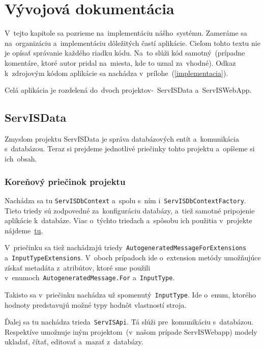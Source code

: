 \chapter{Vývojová dokumentácia}

V~tejto kapitole sa pozrieme na~implementáciu nášho~systému. Zameráme sa na~organizáciu a~implementáciu dôležitých častí aplikácie. Cieľom tohto textu nie je opísať správanie každého riadku kódu. Na~to slúži kód samotný~(prípadne komentáre, ktoré autor pridal na~miesta, kde to uznal za~vhodné). Odkaz k~zdrojovým kódom aplikácie sa nachádza v~prílohe~(\ref{implementacia}).

Celá aplikácia je rozdelená do~dvoch projektov-~ServISData a~ServISWebApp.

\section{ServISData}

Zmyslom projektu ServISData je správa databázových entít a~komunikácia s~databázou. Teraz si prejdeme jednotlivé priečinky tohto projektu a~opíšeme si ich~obsah.

\subsection{Koreňový priečinok projektu}

Nachádza sa tu \verb|ServISDbContext| a~spolu s~ním i~\verb|ServISDbContextFactory|. Tieto triedy sú zodpovedné za~konfiguráciu databázy, a~tiež samotné pripojenie aplikácie k~databáze. Viac o~týchto triedach a~spôsobu ich použitia v~projekte nájdeme~\href{https://learn.microsoft.com/en-us/ef/core/dbcontext-configuration/\#using-a-dbcontext-factory-eg-for-blazor}{tu}.

V~priečinku sa tiež nachádzajú triedy~\verb|AutogeneratedMessageForExtensions| a~\verb|InputTypeExtensions|. V~oboch prípadoch ide o~extension metódy umožňujúce získať metadáta z~atribútov, ktoré sme použili\\v~enumoch~\verb|AutogeneratedMessage.For| a~\verb|InputType|.

Takisto sa v~priečinku nachádza už spomenutý~\verb|InputType|. Ide o~enum, ktorého hodnoty predstavujú možné typy hodnôt vlastností stroja.

Ďalej sa tu nachádza trieda~\verb|ServISApi|. Tá slúži pre~komunikáciu s~databázou. Respektíve umožnuje iným projektom~(v~našom prípade ServISWebapp) modely ukladať, čítať, editovať a~mazať z~databázy.

